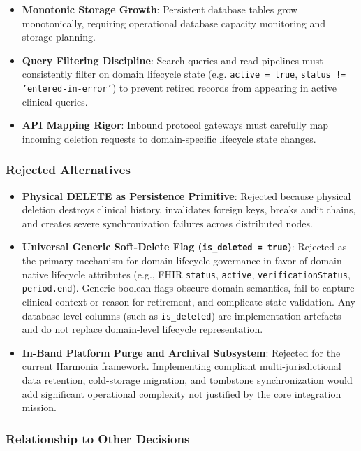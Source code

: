 \begin{itemize}
    \item \textbf{Monotonic Storage Growth}: Persistent database tables grow monotonically, requiring operational database capacity monitoring and storage planning.
    \item \textbf{Query Filtering Discipline}: Search queries and read pipelines must consistently filter on domain lifecycle state (e.g. \texttt{active = true}, \texttt{status != 'entered-in-error'}) to prevent retired records from appearing in active clinical queries.
    \item \textbf{API Mapping Rigor}: Inbound protocol gateways must carefully map incoming deletion requests to domain-specific lifecycle state changes.
\end{itemize}

\subsubsection{Rejected Alternatives}

\begin{itemize}
    \item \textbf{Physical DELETE as Persistence Primitive}: Rejected because physical deletion destroys clinical history, invalidates foreign keys, breaks audit chains, and creates severe synchronization failures across distributed nodes.
    \item \textbf{Universal Generic Soft-Delete Flag (\texttt{is\_deleted = true})}: Rejected as the primary mechanism for domain lifecycle governance in favor of domain-native lifecycle attributes (e.g., FHIR \texttt{status}, \texttt{active}, \texttt{verificationStatus}, \texttt{period.end}). Generic boolean flags obscure domain semantics, fail to capture clinical context or reason for retirement, and complicate state validation. Any database-level columns (such as \texttt{is\_deleted}) are implementation artefacts and do not replace domain-level lifecycle representation.
    \item \textbf{In-Band Platform Purge and Archival Subsystem}: Rejected for the current Harmonia framework. Implementing compliant multi-jurisdictional data retention, cold-storage migration, and tombstone synchronization would add significant operational complexity not justified by the core integration mission.
\end{itemize}

\subsubsection{Relationship to Other Decisions}

